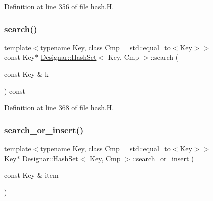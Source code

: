 Definition at line 356 of file hash.\+H.

\mbox{\label{class_designar_1_1_hash_set_a6cd71f72b1676aa364e4aab6687b115b}} 
\subsubsection{\texorpdfstring{search()}{search()}\hspace{0.1cm}{\footnotesize\ttfamily [2/2]}}
{\footnotesize\ttfamily template$<$typename Key, class Cmp = std\+::equal\+\_\+to$<$\+Key$>$$>$ \\
const Key$\ast$ \hyperlink{class_designar_1_1_hash_set}{Designar\+::\+Hash\+Set}$<$ Key, Cmp $>$\+::search (\begin{DoxyParamCaption}\item[{const Key \&}]{k }\end{DoxyParamCaption}) const\hspace{0.3cm}{\ttfamily [inline]}}



Definition at line 368 of file hash.\+H.

\mbox{\label{class_designar_1_1_hash_set_abb9cb610eed9832735c6f0bcafbb1dea}} 
\subsubsection{\texorpdfstring{search\+\_\+or\+\_\+insert()}{search\_or\_insert()}\hspace{0.1cm}{\footnotesize\ttfamily [1/2]}}
{\footnotesize\ttfamily template$<$typename Key, class Cmp = std\+::equal\+\_\+to$<$\+Key$>$$>$ \\
Key$\ast$ \hyperlink{class_designar_1_1_hash_set}{Designar\+::\+Hash\+Set}$<$ Key, Cmp $>$\+::search\+\_\+or\+\_\+insert (\begin{DoxyParamCaption}\item[{const Key \&}]{item }\end{DoxyParamCaption})\hspace{0.3cm}{\ttfamily [inline]}}



